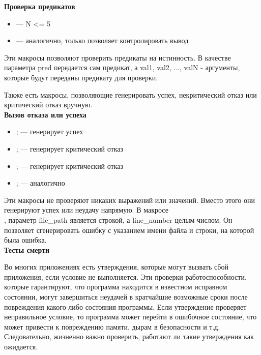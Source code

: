 \documentclass[a4paper, 11pt]{article}
\newcommand{\assertiontype}[1]{{\large \bfseries #1}}
\begin{document}
	
	\assertiontype{Проверка предикатов}
	
	\begin{itemize}
		\item {} --- N <= 5
		\item {} --- аналогично, только позволяет контролировать вывод
	\end{itemize}

	Эти макросы позволяют проверить предикаты на истинность. В качестве параметра pred передается сам предикат, а val1, val2, ..., valN - аргументы, которые будут переданы предикату для проверки.

	
	Также есть макросы, позволяющие генерировать успех, некритический отказ или критический отказ вручную.\\
	
	\assertiontype{Вызов отказа или успеха}
	
	\begin{itemize}
		\item {}; --- генерирует успех
		\item {}; --- генерирует критический отказ
		\item {}; --- генерирует критический отказ
		\item {}; --- аналогично
	\end{itemize}

	Эти макросы не проверяют никаких выражений или значений. Вместо этого они генерируют успех или неудачу напрямую. В макросе\\ , параметр file\_path является строкой, а line\_number целым числом. Он позволяет сгенерировать ошибку с указанием имени файла и строки, на которой была ошибка.\\
	
	\assertiontype{Тесты смерти}
	
	Во многих приложениях есть утверждения, которые могут вызвать сбой приложения, если условие не выполняется. Эти проверки работоспособности, которые гарантируют, что программа находится в известном исправном состоянии, могут завершиться неудачей в кратчайшие возможные сроки после повреждения какого-либо состояния программы. Если утверждение проверяет неправильное условие, то программа может перейти в ошибочное состояние, что может привести к повреждению памяти, дырам в безопасности и т.д. Следовательно, жизненно важно проверить, работают ли такие утверждения как ожидается.\\
	
\end{document}
